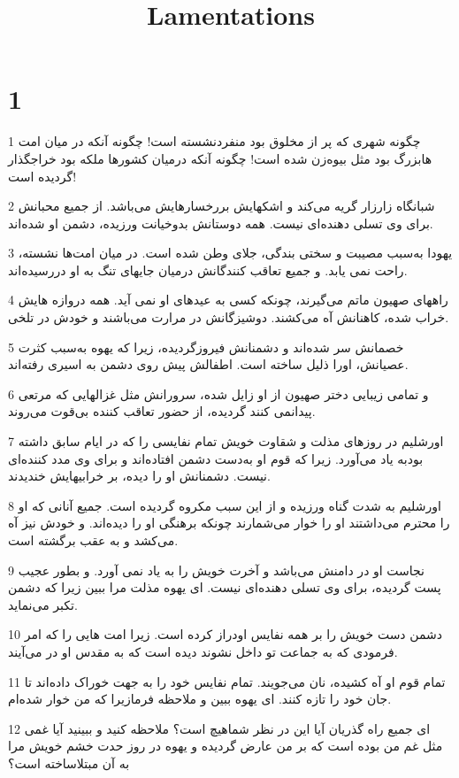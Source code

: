 

\title{Lamentations}

 
\chapter{1}

\par 1 چگونه شهری که پر از مخلوق بود منفردنشسته است! چگونه آنکه در میان امت هابزرگ بود مثل بیوه‌زن شده است! چگونه آنکه درمیان کشورها ملکه بود خراجگذار گردیده است!
\par 2 شبانگاه زارزار گریه می‌کند و اشکهایش بررخسارهایش می‌باشد. از جمیع محبانش برای وی تسلی دهنده‌ای نیست. همه دوستانش بدوخیانت ورزیده، دشمن او شده‌اند.
\par 3 یهودا به‌سبب مصیبت و سختی بندگی، جلای وطن شده است. در میان امت‌ها نشسته، راحت نمی یابد. و جمیع تعاقب کنندگانش درمیان جایهای تنگ به او در‌رسیده‌اند.
\par 4 راههای صهیون ماتم می‌گیرند، چونکه کسی به عیدهای او نمی آید. همه دروازه هایش خراب شده، کاهنانش آه می‌کشند. دوشیزگانش در مرارت می‌باشند و خودش در تلخی.
\par 5 خصمانش سر شده‌اند و دشمنانش فیروزگردیده، زیرا که یهوه به‌سبب کثرت عصیانش، اورا ذلیل ساخته است. اطفالش پیش روی دشمن به اسیری رفته‌اند.
\par 6 و تمامی زیبایی دختر صهیون از او زایل شده، سرورانش مثل غزالهایی که مرتعی پیدانمی کنند گردیده، از حضور تعاقب کننده بی‌قوت می‌روند.
\par 7 اورشلیم در روزهای مذلت و شقاوت خویش تمام نفایسی را که در ایام سابق داشته بودبه یاد می‌آورد. زیرا که قوم او به‌دست دشمن افتاده‌اند و برای وی مدد کننده‌ای نیست. دشمنانش او را دیده، بر خرابیهایش خندیدند.
\par 8 اورشلیم به شدت گناه ورزیده و از این سبب مکروه گردیده است. جمیع آنانی که او را محترم می‌داشتند او را خوار می‌شمارند چونکه برهنگی او را دیده‌اند. و خودش نیز آه می‌کشد و به عقب برگشته است.
\par 9 نجاست او در دامنش می‌باشد و آخرت خویش را به یاد نمی آورد. و بطور عجیب پست گردیده، برای وی تسلی دهنده‌ای نیست. ای یهوه مذلت مرا ببین زیرا که دشمن تکبر می‌نماید.
\par 10 دشمن دست خویش را بر همه نفایس اودراز کرده است. زیرا امت هایی را که امر فرمودی که به جماعت تو داخل نشوند دیده است که به مقدس او در می‌آیند.
\par 11 تمام قوم او آه کشیده، نان می‌جویند. تمام نفایس خود را به جهت خوراک داده‌اند تا جان خود را تازه کنند. ای یهوه ببین و ملاحظه فرمازیرا که من خوار شده‌ام.
\par 12 ‌ای جمیع راه گذریان آیا این در نظر شماهیچ است؟ ملاحظه کنید و ببینید آیا غمی مثل غم من بوده است که بر من عارض گردیده و یهوه در روز حدت خشم خویش مرا به آن مبتلاساخته است؟
